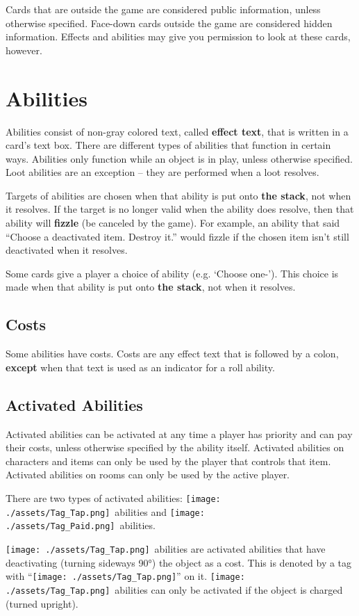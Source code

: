 \documentclass[10pt, a4paper, twoside]{article} %
\newcommand{\tap}{\texttt{[image: ./assets/Tag\_Tap.png]}}
\newcommand{\pay}{\texttt{[image: ./assets/Tag\_Paid.png]}}
\begin{document}
    Cards that are outside the game are considered public information, unless otherwise specified. Face-down cards outside the game are considered hidden information. Effects and abilities may give you permission to look at these cards, however.

    \section{Abilities}
    \label{abilities}
    Abilities consist of non-gray colored text, called \textbf{effect text}, that is written in a card’s text box. There are different types of abilities that function in certain ways. Abilities only function while an object is in play, unless otherwise specified. Loot abilities are an exception – they are performed when a loot resolves.

    Targets of abilities are chosen when that ability is put onto \textbf{the stack}, not when it resolves. If the target is no longer valid when the ability does resolve, then that ability will \textbf{fizzle} (be canceled by the game). For example, an ability that said “Choose a deactivated item. Destroy it.” would fizzle if the chosen item isn’t still deactivated when it resolves.

    Some cards give a player a choice of ability (e.g. ‘Choose one-’). This choice is made when that ability is put onto \textbf{the stack}, not when it resolves.

    \subsection{Costs}
    Some abilities have costs. Costs are any effect text that is followed by a colon, \textbf{except} when that text is used as an indicator for a roll ability.

    \subsection{Activated Abilities}
    Activated abilities can be activated at any time a player has priority and can pay their costs, unless otherwise specified by the ability itself. Activated abilities on characters and items can only be used by the player that controls that item. Activated abilities on rooms can only be used by the active player.

    There are two types of activated abilities: \tap\ abilities and \pay\ abilities.
    
    \tap\ abilities are activated abilities that have deactivating (turning sideways 90°) the object as a cost. This is denoted by a tag with “\tap” on it. \tap\ abilities can only be activated if the object is charged (turned upright).
    
\end{document}
